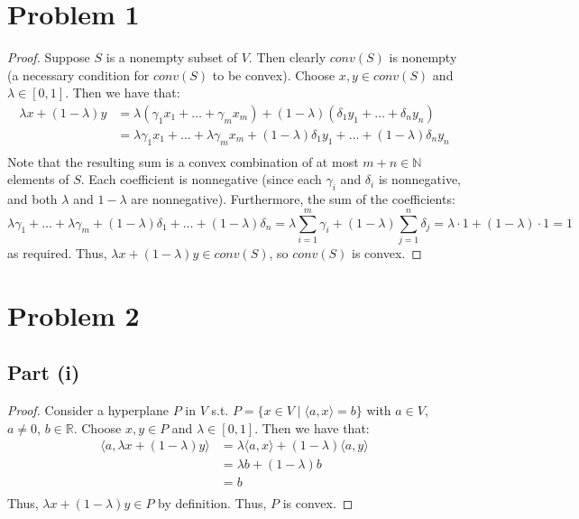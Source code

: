 \documentclass{article}
\begin{document}
\section*{Problem 1}

\begin{proof}
Suppose $S$ is a nonempty subset of $V$. Then clearly $conv(S)$ is nonempty (a necessary condition for $conv(S)$ to be convex). Choose $x, y \in conv(S)$ and $\lambda \in [0, 1]$. Then we have that:
\begin{align*}
\lambda x + (1 - \lambda)y &= \lambda (\gamma_{1}x_1 + \dots + \gamma_{m}x_m) + (1 - \lambda)(\delta_{1}y_1 + \dots + \delta_{n}y_n) \\
&=  \lambda\gamma_{1}x_1 + \dots + \lambda\gamma_{m}x_m + (1 - \lambda)\delta_{1}y_1 + \dots + (1 - \lambda)\delta_{n}y_n \\
\end{align*}
Note that the resulting sum is a convex combination of at most $m + n \in \mathbb{N}$ elements of $S$. Each coefficient is nonnegative (since each $\gamma_i$ and $\delta_i$ is nonnegative, and both $\lambda$ and $1 - \lambda$ are nonnegative). Furthermore, the sum of the coefficients:
$$\lambda\gamma_{1} + \dots + \lambda\gamma_{m} + (1 - \lambda)\delta_{1} + \dots + (1 - \lambda)\delta_{n} = \lambda\sum\limits_{i = 1}^{m}\gamma_i + (1 - \lambda)\sum\limits_{j = 1}^{n}\delta_j = \lambda \cdot 1 + (1 - \lambda) \cdot 1 = 1$$
as required. Thus, $\lambda x + (1 - \lambda)y \in conv(S)$, so $conv(S)$ is convex.
\end{proof}


\section*{Problem 2}

\subsection*{Part (i)}

\begin{proof}
Consider a hyperplane $P$ in $V$ s.t. $P = \{x \in V \mid \langle a, x\rangle = b\}$ with $a \in V$, $a \ne 0$, $b \in \mathbb{R}$. Choose $x, y \in P$ and $\lambda \in [0, 1]$. Then we have that:
\begin{align*}
\langle a, \lambda x + (1 - \lambda)y \rangle &= \lambda\langle a, x \rangle + (1 - \lambda)\langle a, y \rangle \\
&= \lambda b + (1 - \lambda)b \\
&= b \\
\end{align*}
Thus, $\lambda x + (1 - \lambda)y \in P$ by definition. Thus, $P$ is convex.
\end{proof}
\end{document}
